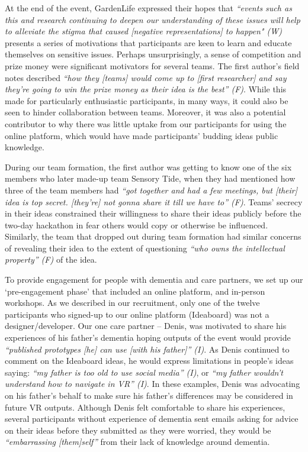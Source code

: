At the end of the event, GardenLife expressed their hopes that \textit{“events such as this and research continuing to deepen our understanding of these issues will help to alleviate the stigma that caused [negative representations] to happen" (W)} presents a series of motivations that participants are keen to learn and educate themselves on sensitive issues. Perhaps unsurprisingly, a sense of competition and prize money were significant motivators for several teams. The first author’s field notes described \textit{“how they [teams] would come up to [first researcher] and say they’re going to win the prize money as their idea is the best” (F)}. While this made for particularly enthusiastic participants, in many ways, it could also be seen to hinder collaboration between teams. Moreover, it was also a potential contributor to why there was little uptake from our participants for using the online platform, which would have made participants’ budding ideas public knowledge.

During our team formation, the first author was getting to know one of the six members who later made-up team Sensory Tide, when they had mentioned how three of the team members had \textit{“got together and had a few meetings, but [their] idea is top secret. [they’re] not gonna share it till we have to” (F)}. Teams’ secrecy in their ideas constrained their willingness to share their ideas publicly before the two-day hackathon in fear others would copy or otherwise be influenced. Similarly, the team that dropped out during team formation had similar concerns of revealing their idea to the extent of questioning \textit{“who owns the intellectual property” (F)} of the idea. 

To provide engagement for people with dementia and care partners, we set up our ‘pre-engagement phase’ that included an online platform, and in-person workshops. As we described in our recruitment, only one of the twelve participants who signed-up to our online platform (Ideaboard) was not a designer/developer. Our one care partner – Denis, was motivated to share his experiences of his father’s dementia hoping outputs of the event would provide \textit{“published prototypes [he] can use [with his father]” (I)}. As Denis continued to comment on the Ideaboard ideas, he would express limitations in people’s ideas saying:\textit{ “my father is too old to use social media” (I)}, or \textit{“my father wouldn’t understand how to navigate in VR” (I)}. In these examples, Denis was advocating on his father’s behalf to make sure his father’s differences may be considered in future VR outputs. Although Denis felt comfortable to share his experiences, several participants without experience of dementia sent emails asking for advice on their ideas before they submitted as they were worried, they would be \textit{“embarrassing [them]self”} from their lack of knowledge around dementia. 

